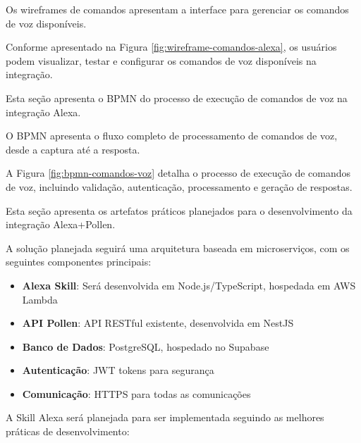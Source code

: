 
Os wireframes de comandos apresentam a interface para gerenciar os comandos de voz disponíveis.



Conforme apresentado na Figura \ref{fig:wireframe-comandos-alexa}, os usuários podem visualizar, testar e configurar os comandos de voz disponíveis na integração.

\label{sec:processos-sistema}

Esta seção apresenta o BPMN do processo de execução de comandos de voz na integração Alexa.


O BPMN apresenta o fluxo completo de processamento de comandos de voz, desde a captura até a resposta.



A Figura \ref{fig:bpmn-comandos-voz} detalha o processo de execução de comandos de voz, incluindo validação, autenticação, processamento e geração de respostas.

\label{sec:artefatos-praticos}

Esta seção apresenta os artefatos práticos planejados para o desenvolvimento da integração Alexa+Pollen.


A solução planejada seguirá uma arquitetura baseada em microserviços, com os seguintes componentes principais:

\begin{itemize}
    \item \textbf{Alexa Skill}: Será desenvolvida em Node.js/TypeScript, hospedada em AWS Lambda
    \item \textbf{API Pollen}: API RESTful existente, desenvolvida em NestJS
    \item \textbf{Banco de Dados}: PostgreSQL, hospedado no Supabase
    \item \textbf{Autenticação}: JWT tokens para segurança
    \item \textbf{Comunicação}: HTTPS para todas as comunicações
\end{itemize}


A Skill Alexa será planejada para ser implementada seguindo as melhores práticas de desenvolvimento:

